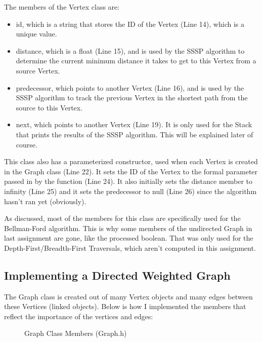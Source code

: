 \documentclass[letterpaper, 10pt]{article}
\begin{document}
\noindent
The members of the Vertex class are:
\begin{itemize}
    \item id, which is a string that stores the ID of the Vertex (Line 14), which is a unique value.
    \item distance, which is a float (Line 15), and is used by the SSSP algorithm to determine the current minimum distance it takes to get to this Vertex from a source Vertex.
    \item predecessor, which points to another Vertex (Line 16), and is used by the SSSP algorithm to track the previous Vertex in the shortest path from the source to this Vertex. 
    \item next, which points to another Vertex (Line 19). It is only used for the Stack that prints the results of the SSSP algorithm. This will be explained later of course.
\end{itemize}

\noindent
This class also has a parameterized constructor, used when each Vertex is created in the Graph class (Line 22). It sets the ID of the Vertex to the formal parameter passed in by the function (Line 24). It also initially sets the distance member to infinity (Line 25) and it sets the predecessor to null (Line 26) since the algorithm hasn't ran yet (obviously).

\vspace{1em}

\noindent
As discussed, most of the members for this class are specifically used for the Bellman-Ford algorithm. This is why some members of the undirected Graph in last assignment are gone, like the processed boolean. That was only used for the Depth-First/Breadth-First Traversals, which aren't computed in this assignment.  

\vspace{5em}
\subsection{Implementing a Directed Weighted Graph}
\noindent
The Graph class is created out of many Vertex objects and many edges between these Vertices (linked objects). Below is how I implemented the members that reflect the importance of the vertices and edges:

\vspace{-0.5em}
\begin{figure}[H]
  \centering
  
  \caption{Graph Class Members (Graph.h)}
  \label{fig:figure2.5}
\end{figure}
\end{document}
